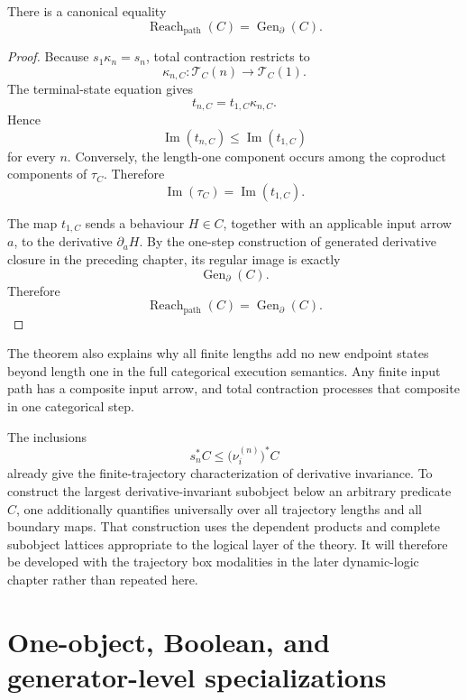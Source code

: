 \begin{theorem}
\label{thm:generated-closure-temporal-reachability}
There is a canonical equality
\[
    \operatorname{Reach}_{\mathrm{path}}(C)
    =
    \operatorname{Gen}_{\partial}(C).
\]
\end{theorem}

\begin{proof}
Because \(s_1\kappa_n=s_n\), total contraction restricts to
\[
    \kappa_{n,C}:
    \mathscr T_C(n)
    \to
    \mathscr T_C(1).
\]
The terminal-state equation gives
\[
    t_{n,C}
    =
    t_{1,C}\kappa_{n,C}.
\]
Hence
\[
    \operatorname{Im}(t_{n,C})
    \leq
    \operatorname{Im}(t_{1,C})
\]
for every \(n\). Conversely, the length-one component occurs among the
coproduct components of \(\tau_C\). Therefore
\[
    \operatorname{Im}(\tau_C)
    =
    \operatorname{Im}(t_{1,C}).
\]

The map \(t_{1,C}\) sends a behaviour \(H\in C\), together with an
applicable input arrow \(a\), to the derivative \(\partial_aH\). By the
one-step construction of generated derivative closure in the preceding
chapter, its regular image is exactly
\[
    \operatorname{Gen}_{\partial}(C).
\]
Therefore
\[
    \operatorname{Reach}_{\mathrm{path}}(C)
    =
    \operatorname{Gen}_{\partial}(C).
\]
\end{proof}

The theorem also explains why all finite lengths add no new endpoint states
beyond length one in the full categorical execution semantics. Any finite
input path has a composite input arrow, and total contraction processes that
composite in one categorical step.

\begin{remark}
\label{rem:residual-universal-safety-deferred}
The inclusions
\[
    s_n^\ast C
    \leq
    \bigl(\nu_i^{(n)}\bigr)^\ast C
\]
already give the finite-trajectory characterization of derivative
invariance.  To construct the largest derivative-invariant subobject below an
arbitrary predicate \(C\), one additionally quantifies universally over all
trajectory lengths and all boundary maps.  That construction uses the
dependent products and complete subobject lattices appropriate to the
logical layer of the theory.  It will therefore be developed with the
trajectory box modalities in the later dynamic-logic chapter rather than
repeated here.
\end{remark}

\section{One-object, Boolean, and generator-level specializations}
\label{sec:temporal-one-object-boolean}

